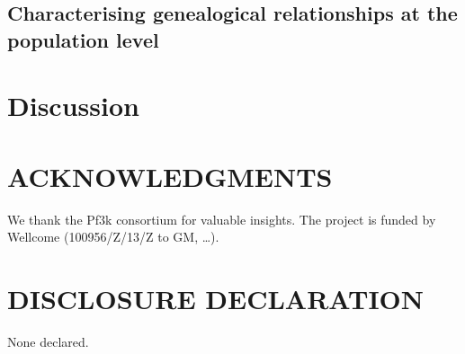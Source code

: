 \documentclass[9pt,lineno]{elife}
\begin{document}
\subsection{Characterising genealogical relationships at the population level}







\section{Discussion}




\section{ACKNOWLEDGMENTS}
We thank the Pf3k consortium for valuable insights. The project is funded by  Wellcome (100956/Z/13/Z to GM, \ldots).




\section{DISCLOSURE DECLARATION}
None declared.






\end{document}
